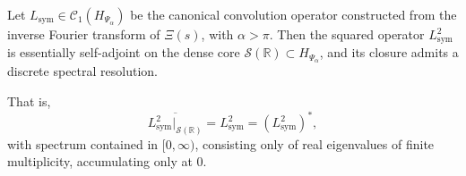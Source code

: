 \begin{lemma}
\label{lem:Lsym-square-selfadjoint}
Let \( L_{\mathrm{sym}} \in \mathcal{C}_1(H_{\Psi_\alpha}) \) be the canonical convolution operator constructed from the inverse Fourier transform of \( \Xi(s) \), with \( \alpha > \pi \). Then the squared operator \( L_{\mathrm{sym}}^2 \) is essentially self-adjoint on the dense core \( \mathcal{S}(\mathbb{R}) \subset H_{\Psi_\alpha} \), and its closure admits a discrete spectral resolution.

That is,
\[
\overline{L_{\mathrm{sym}}^2|_{\mathcal{S}(\mathbb{R})}} = L_{\mathrm{sym}}^2 = \left( L_{\mathrm{sym}}^2 \right)^*,
\]
with spectrum contained in \( [0, \infty) \), consisting only of real eigenvalues of finite multiplicity, accumulating only at 0.
\end{lemma}
